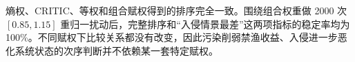 熵权、CRITIC、等权和组合赋权得到的排序完全一致。围绕组合权重做 2000 次 $[0.85,1.15]$ 重归一扰动后，完整排序和“入侵情景最差”这两项指标的稳定率均为 100\%。不同赋权下比较关系都没有改变，因此污染削弱禁渔收益、入侵进一步恶化系统状态的次序判断并不依赖某一套特定赋权。
